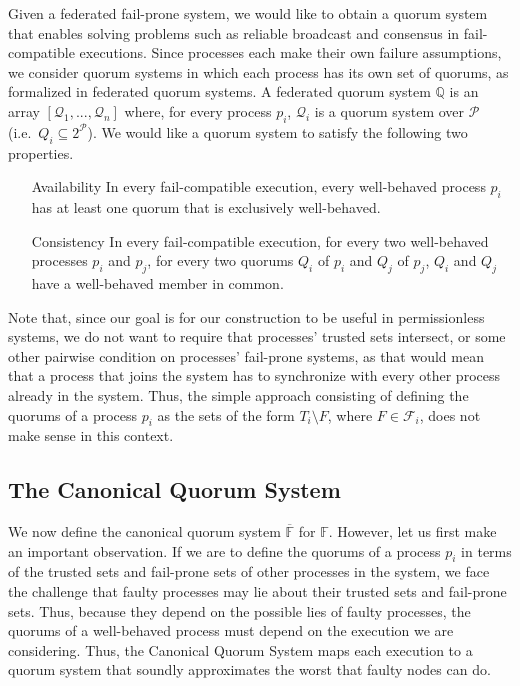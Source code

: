 \documentclass[11pt,letterpaper]{article}
\begin{document}
Given a federated fail-prone system, we would like to obtain a quorum system that enables solving problems such as reliable broadcast and consensus in fail-compatible executions.
Since processes each make their own failure assumptions, we consider quorum systems in which each process has its own set of quorums, as formalized in federated quorum systems.
A federated quorum system $\mathbb{Q}$ is an array $\left[\mathcal{Q}_1,...,\mathcal{Q}_n\right]$ where, for every process $p_i$, $\mathcal{Q}_i$ is a quorum system over $\mathcal{P}$ (i.e.\ $Q_i\subseteq 2^{\mathcal{P}}$).
We would like a quorum system to satisfy the following two properties.
\begin{itemize}
  \item[Availability] In every fail-compatible execution, every well-behaved process $p_i$  has at least one quorum that is exclusively well-behaved.
  \item[Consistency] In every fail-compatible execution, for every two well-behaved processes $p_i$ and $p_j$, for every two quorums $Q_i$ of $p_i$ and $Q_j$ of $p_j$, $Q_i$ and $Q_j$ have a well-behaved member in common.
\end{itemize}

Note that, since our goal is for our construction to be useful in permissionless systems, we do not want to require that processes' trusted sets intersect, or some other pairwise condition on processes' fail-prone systems, as that would mean that a process that joins the system has to synchronize with every other process already in the system.
Thus, the simple approach consisting of defining the quorums of a process $p_i$ as the sets of the form $T_i\setminus F$, where $F\in\mathcal{F}_i$, does not make sense in this context.

\subsection{The Canonical Quorum System}

We now define the canonical quorum system $\overline{\mathbb{F}}$ for $\mathbb{F}$.
However, let us first make an important observation.
If we are to define the quorums of a process $p_i$ in terms of the trusted sets and fail-prone sets of other processes in the system, we face the challenge that faulty processes may lie about their trusted sets and fail-prone sets.
Thus, because they depend on the possible lies of faulty processes, the quorums of a well-behaved process must depend on the execution we are considering.
Thus, the Canonical Quorum System maps each execution to a quorum system that soundly approximates the worst that faulty nodes can do.
\end{document}
